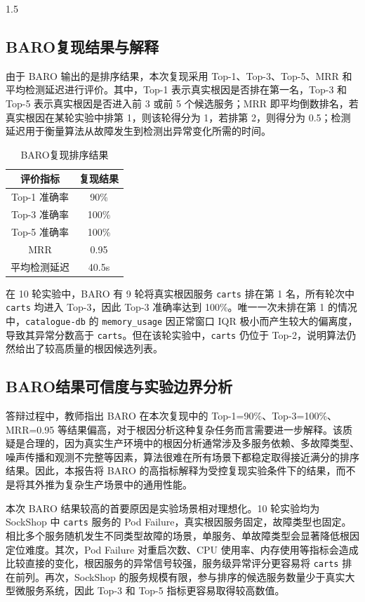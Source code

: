 \documentclass[a4paper,12pt]{report}
\begin{document}
\begin{spacing}{1.5}
\subsection{BARO复现结果与解释}

由于 BARO 输出的是排序结果，本次复现采用 Top-1、Top-3、Top-5、MRR 和平均检测延迟进行评价。其中，Top-1 表示真实根因是否排在第一名，Top-3 和 Top-5 表示真实根因是否进入前 3 或前 5 个候选服务；MRR 即平均倒数排名，若真实根因在某轮实验中排第 1，则该轮得分为 1，若排第 2，则得分为 0.5；检测延迟用于衡量算法从故障发生到检测出异常变化所需的时间。

\begin{table}[H]
\centering
\caption{BARO复现排序结果}
\begin{tabular}{cc}
\toprule
\textbf{评价指标} & \textbf{复现结果} \\
\midrule
Top-1 准确率 & 90\% \\
Top-3 准确率 & 100\% \\
Top-5 准确率 & 100\% \\
MRR & 0.95 \\
平均检测延迟 & 40.5s \\
\bottomrule
\end{tabular}
\end{table}

在 10 轮实验中，BARO 有 9 轮将真实根因服务 \texttt{carts} 排在第 1 名，所有轮次中 \texttt{carts} 均进入 Top-3，因此 Top-3 准确率达到 100\%。唯一一次未排在第 1 的情况中，\texttt{catalogue-db} 的 \texttt{memory\_usage} 因正常窗口 IQR 极小而产生较大的偏离度，导致其异常分数高于 \texttt{carts}。但在该轮实验中，\texttt{carts} 仍位于 Top-2，说明算法仍然给出了较高质量的根因候选列表。

\subsection{BARO结果可信度与实验边界分析}

答辩过程中，教师指出 BARO 在本次复现中的 Top-1=90\%、Top-3=100\%、MRR=0.95 等结果偏高，对于根因分析这种复杂任务而言需要进一步解释。该质疑是合理的，因为真实生产环境中的根因分析通常涉及多服务依赖、多故障类型、噪声传播和观测不完整等因素，算法很难在所有场景下都稳定取得接近满分的排序结果。因此，本报告将 BARO 的高指标解释为受控复现实验条件下的结果，而不是将其外推为复杂生产场景中的通用性能。

本次 BARO 结果较高的首要原因是实验场景相对理想化。10 轮实验均为 SockShop 中 \texttt{carts} 服务的 Pod Failure，真实根因服务固定，故障类型也固定。相比多个服务随机发生不同类型故障的场景，单服务、单故障类型会显著降低根因定位难度。其次，Pod Failure 对重启次数、CPU 使用率、内存使用等指标会造成比较直接的变化，根因服务的异常信号较强，服务级异常评分更容易将 \texttt{carts} 排在前列。再次，SockShop 的服务规模有限，参与排序的候选服务数量少于真实大型微服务系统，因此 Top-3 和 Top-5 指标更容易取得较高数值。


\end{spacing}
\end{document}
